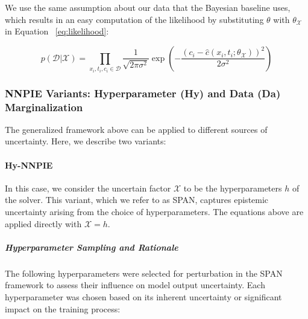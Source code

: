 We use the same assumption about our data that the Bayesian baseline uses, which results in an easy computation of the likelihood by substituting $\theta$ with $\theta_{\mathcal{X}}$ in Equation ~\vref{eq:likelihood}:

\begin{equation*}
p(\mathcal{D} | \mathcal{X}) = \prod_{x_i, t_i, c_i \in \mathcal{D}} \frac{1}{\sqrt{2\pi \sigma^2}} \exp \left( -\frac{(c_i - \hat{c}(x_i, t_i; \theta_{\mathcal{X}}))^2}{2\sigma^2} \right)
\end{equation*}

\subsubsection{NNPIE Variants: Hyperparameter (Hy) and Data (Da) Marginalization}

The generalized framework above can be applied to different sources of uncertainty. Here, we describe two variants:

\paragraph{Hy-NNPIE}

In this case, we consider the uncertain factor $\mathcal{X}$ to be the hyperparameters $h$ of the solver. This variant, which we refer to as SPAN, captures epistemic uncertainty arising from the choice of hyperparameters. The equations above are applied directly with $\mathcal{X} = h$.

\subparagraph{Hyperparameter Sampling and Rationale}
The following hyperparameters were selected for perturbation in the SPAN framework to assess their influence on model output uncertainty. Each hyperparameter was chosen based on its inherent uncertainty or significant impact on the training process:

